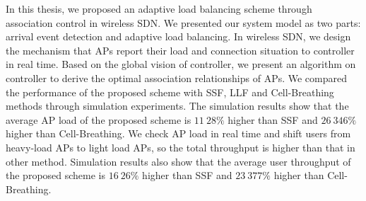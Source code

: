 In this thesis, we proposed an adaptive load balancing scheme through association control in wireless SDN. We presented our system model as two parts: arrival event detection and adaptive load balancing. In wireless SDN, we design the mechanism that APs report their load and connection situation to controller in real time. Based on the global vision of controller, we present an algorithm on controller to derive the optimal association relationships of APs.
We compared the performance of the proposed scheme with SSF, LLF and Cell-Breathing methods through simulation experiments. The simulation results show that the average AP load of the proposed scheme is $11~28\%$ higher than SSF and $26~346\%$ higher than Cell-Breathing. We check AP load in real time and shift users from heavy-load APs to light load APs, so the total throughput is higher than that in other method. Simulation results also show that the average user throughput of the proposed scheme is $16~26\%$ higher than SSF and $23~377\%$ higher than Cell-Breathing.

